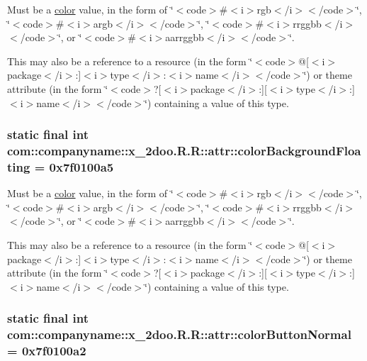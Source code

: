 Must be a \hyperlink{classcom_1_1companyname_1_1x__2doo_1_1_r_1_1color}{color} value, in the form of \char`\"{}$<$code$>$\#$<$i$>$rgb$<$/i$>$$<$/code$>$\char`\"{}, \char`\"{}$<$code$>$\#$<$i$>$argb$<$/i$>$$<$/code$>$\char`\"{}, \char`\"{}$<$code$>$\#$<$i$>$rrggbb$<$/i$>$$<$/code$>$\char`\"{}, or \char`\"{}$<$code$>$\#$<$i$>$aarrggbb$<$/i$>$$<$/code$>$\char`\"{}. 

This may also be a reference to a resource (in the form \char`\"{}$<$code$>$@\mbox{[}$<$i$>$package$<$/i$>$:\mbox{]}$<$i$>$type$<$/i$>$:$<$i$>$name$<$/i$>$$<$/code$>$\char`\"{}) or theme attribute (in the form \char`\"{}$<$code$>$?\mbox{[}$<$i$>$package$<$/i$>$:\mbox{]}\mbox{[}$<$i$>$type$<$/i$>$:\mbox{]}$<$i$>$name$<$/i$>$$<$/code$>$\char`\"{}) containing a value of this type. \hypertarget{classcom_1_1companyname_1_1x__2doo_1_1_r_1_1attr_693dff0b6dfa82e8f31b07a545c9aafd}{
\subsubsection[{colorBackgroundFloating}]{\setlength{\rightskip}{0pt plus 5cm}static final int com::companyname::x\_\-2doo.R.R::attr::colorBackgroundFloating = 0x7f0100a5}}
\label{classcom_1_1companyname_1_1x__2doo_1_1_r_1_1attr_693dff0b6dfa82e8f31b07a545c9aafd}


Must be a \hyperlink{classcom_1_1companyname_1_1x__2doo_1_1_r_1_1color}{color} value, in the form of \char`\"{}$<$code$>$\#$<$i$>$rgb$<$/i$>$$<$/code$>$\char`\"{}, \char`\"{}$<$code$>$\#$<$i$>$argb$<$/i$>$$<$/code$>$\char`\"{}, \char`\"{}$<$code$>$\#$<$i$>$rrggbb$<$/i$>$$<$/code$>$\char`\"{}, or \char`\"{}$<$code$>$\#$<$i$>$aarrggbb$<$/i$>$$<$/code$>$\char`\"{}. 

This may also be a reference to a resource (in the form \char`\"{}$<$code$>$@\mbox{[}$<$i$>$package$<$/i$>$:\mbox{]}$<$i$>$type$<$/i$>$:$<$i$>$name$<$/i$>$$<$/code$>$\char`\"{}) or theme attribute (in the form \char`\"{}$<$code$>$?\mbox{[}$<$i$>$package$<$/i$>$:\mbox{]}\mbox{[}$<$i$>$type$<$/i$>$:\mbox{]}$<$i$>$name$<$/i$>$$<$/code$>$\char`\"{}) containing a value of this type. \hypertarget{classcom_1_1companyname_1_1x__2doo_1_1_r_1_1attr_b674806ea7da66e7b679071476fa0e20}{
\subsubsection[{colorButtonNormal}]{\setlength{\rightskip}{0pt plus 5cm}static final int com::companyname::x\_\-2doo.R.R::attr::colorButtonNormal = 0x7f0100a2}}
\label{classcom_1_1companyname_1_1x__2doo_1_1_r_1_1attr_b674806ea7da66e7b679071476fa0e20}


